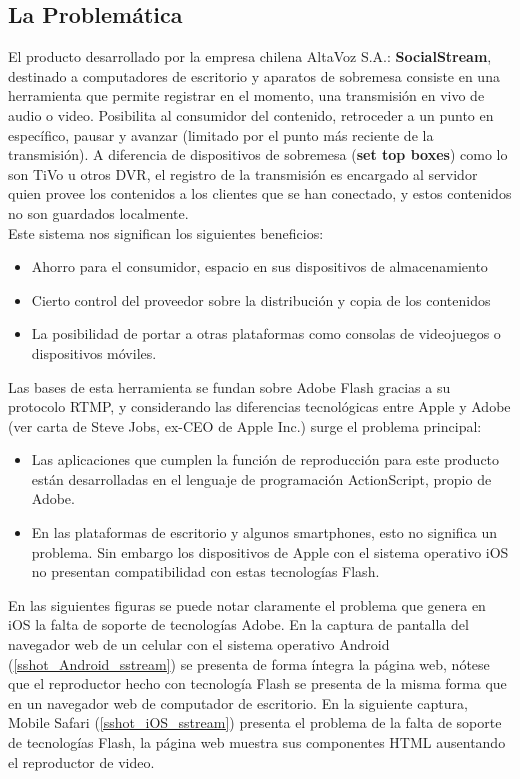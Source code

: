 \subsection{La Problemática}
El producto desarrollado por la empresa chilena AltaVoz S.A.: \textbf{SocialStream}, destinado a computadores de escritorio y aparatos de sobremesa consiste en una herramienta que permite registrar en el momento, una transmisión en vivo de audio o video. Posibilita al consumidor del contenido, retroceder a un punto en específico, pausar  y avanzar (limitado por el punto más reciente de la transmisión). 
A diferencia de dispositivos de sobremesa (\textbf{set top boxes}) como lo son TiVo u otros DVR, el registro de la transmisión es encargado al servidor quien provee los contenidos a los clientes que se han conectado, y estos contenidos no son guardados localmente. \\

Este sistema nos significan los siguientes beneficios: 
\begin{itemize}
\item Ahorro para el consumidor, espacio en sus dispositivos de almacenamiento
\item Cierto control del proveedor sobre la distribución  y copia de los contenidos
\item La posibilidad de portar a otras plataformas como consolas de videojuegos o dispositivos móviles.
\end{itemize}

Las bases de esta herramienta se fundan sobre Adobe Flash gracias a su protocolo RTMP, y considerando las diferencias tecnológicas entre Apple y Adobe (ver \cite{sota:steve-flash} carta de Steve Jobs, ex-CEO de Apple Inc.) surge el problema principal:

\begin{itemize}
\item Las aplicaciones que cumplen la función de reproducción para este producto están desarrolladas en el lenguaje de programación ActionScript, propio de Adobe.
\item En las plataformas de escritorio y algunos smartphones, esto no significa un problema. Sin embargo los dispositivos de Apple con el sistema operativo iOS no presentan compatibilidad con estas tecnologías Flash.
\end{itemize}

	En las siguientes figuras se puede notar claramente el problema que genera en iOS la falta de soporte de tecnologías Adobe. 
	En la captura de pantalla del navegador web de un celular con el sistema operativo Android (\ref{sshot_Android_sstream}) se presenta de forma íntegra la página web, nótese que el reproductor hecho con tecnología Flash se presenta de la misma forma que en un navegador web de computador de escritorio. 
	En la siguiente captura, Mobile Safari (\ref{sshot_iOS_sstream}) presenta el problema de la falta de soporte de tecnologías Flash, la página web muestra sus componentes HTML ausentando el reproductor de video.


